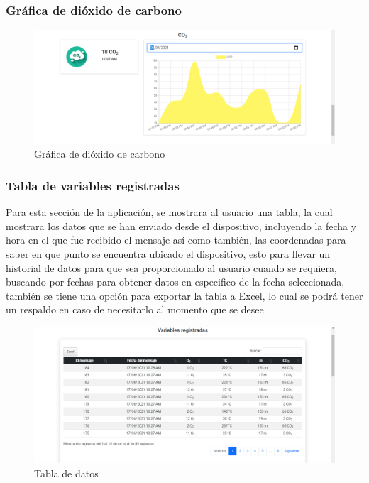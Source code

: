 \documentclass[12pt]{book}
\begin{document}
\subsubsection{Gráfica de dióxido de carbono}

\begin{figure}[h!]
	\centering
	\includegraphics[width=0.7\linewidth]{imagenes/co2Grafica}
	\caption{Gráfica de dióxido de carbono}
	\label{fig:Gráfica de dióxido de carbono}
\end{figure}

\subsubsection{Tabla de variables registradas}

Para esta sección de la aplicación, se mostrara al usuario una tabla, la cual mostrara los datos que se han enviado desde el dispositivo, incluyendo la fecha y hora en el que fue recibido el mensaje así como también, las coordenadas para saber en que punto se encuentra ubicado el dispositivo, esto para llevar un historial de datos para que sea proporcionado al usuario cuando se requiera, buscando por fechas para obtener datos en especifico de la fecha seleccionada, también se tiene una opción para exportar la tabla a Excel, lo cual se podrá tener un respaldo en caso de necesitarlo al momento que se desee.

\begin{figure}[h]
	\centering
	\includegraphics[width=0.8\linewidth]{imagenes/tablaVariables}
	\caption{Tabla de datos}
	\label{fig:Tabla de datos}
\end{figure}
\end{document}

